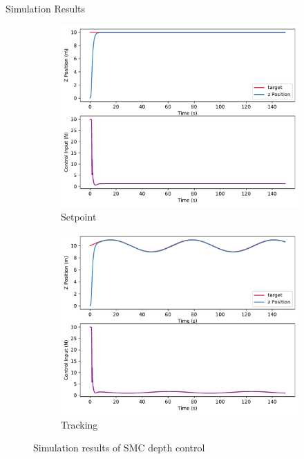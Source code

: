 \documentclass[9pt, xcolor={usenames, dvipsnames}]{beamer}
\begin{document}
        \begin{frame}{Simulation Results}
            \begin{figure}
                \begin{subfigure}{.5\textwidth}
                    \centering
                    \includegraphics[width=\textwidth]{imgs/smc_control_setpoint.pdf}
                    \caption{Setpoint}
                \end{subfigure}%
                \begin{subfigure}{.5\textwidth}
                    \centering
                    \includegraphics[width=\textwidth]{imgs/smc_control_tracking.pdf}
                    \caption{Tracking}
                \end{subfigure}
                \caption{Simulation results of SMC depth control}
            \end{figure}
        \end{frame}
\end{document}
